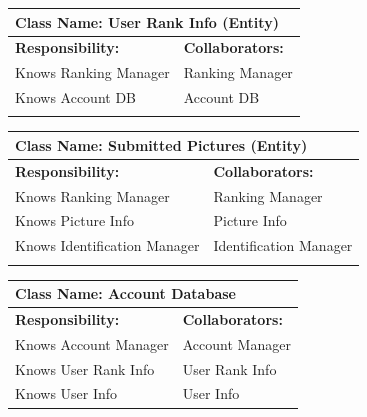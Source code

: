 \documentclass[]{article}
\begin{document}
\begin{itemize}
	\begin{table}
		\centering
		\begin{tabular}{|p{8cm}|p{8cm}|}
		\hline 
		 \multicolumn{2}{|l|}{\textbf{Class Name:} User Rank Info (Entity)} \\
		\hline
		\textbf{Responsibility:} & \textbf{Collaborators:} \\
		\hline
		Knows Ranking Manager & Ranking Manager \\
		Knows Account DB & Account DB \\
		\vspace{1in} & \\
		\hline
		\end{tabular}
	\end{table}

	\begin{table}
		\centering
		\begin{tabular}{|p{8cm}|p{8cm}|}
		\hline 
		 \multicolumn{2}{|l|}{\textbf{Class Name:} Submitted Pictures (Entity)} \\
		\hline
		\textbf{Responsibility:} & \textbf{Collaborators:} \\
		\hline
		Knows Ranking Manager & Ranking Manager \\
		Knows Picture Info & Picture Info \\
		Knows Identification Manager & Identification Manager \\
		\vspace{1in} & \\
		\hline
		\end{tabular}
	\end{table}


	\begin{table}
		\centering
		\begin{tabular}{|p{8cm}|p{8cm}|}
		\hline 
		 \multicolumn{2}{|l|}{\textbf{Class Name:} Account Database} \\
		\hline
		\textbf{Responsibility:} & \textbf{Collaborators:} \\
		\hline 
            Knows Account Manager & Account Manager\\ 
            Knows User Rank Info & User Rank Info \\
            Knows User Info & User Info       
		\vspace{1in} \\
		\hline
		\end{tabular}
	\end{table}


\end{itemize}
\end{document}
